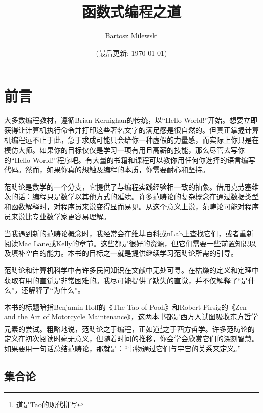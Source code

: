 \documentclass[11pt, book]{memoir}
\begin{document}
\setcounter{tocdepth}{4}
\setcounter{secnumdepth}{4}
\frontmatter

\title{\huge 函数式编程之道}
\author{\Large Bartosz Milewski }

\date{\vfill (最后更新: \today)}

\maketitle

\tableofcontents

\clearpage

\section{前言}

大多数编程教材，遵循Brian Kernighan的传统，以“Hello World!”开始。想要立即获得让计算机执行命令并打印这些著名文字的满足感是很自然的。但真正掌握计算机编程远不止于此，急于求成可能只会给你一种虚假的力量感，而实际上你只是在模仿大师。如果你的目标仅仅是学习一项有用且高薪的技能，那么尽管去写你的“Hello World!”程序吧。有大量的书籍和课程可以教你用任何你选择的语言编写代码。然而，如果你真的想触及编程的本质，你需要耐心和坚持。

范畴论是数学的一个分支，它提供了与编程实践经验相一致的抽象。借用克劳塞维茨的话：编程只是数学以其他方式的延续。许多范畴论的复杂概念在通过数据类型和函数解释时，对程序员来说变得显而易见。从这个意义上说，范畴论可能对程序员来说比专业数学家更容易理解。

当我遇到新的范畴论概念时，我经常会在维基百科或nLab上查找它们，或者重新阅读Mac Lane或Kelly的章节。这些都是很好的资源，但它们需要一些前置知识以及填补空白的能力。本书的目标之一就是提供继续学习范畴论所需的引导。

范畴论和计算机科学中有许多民间知识在文献中无处可寻。在枯燥的定义和定理中获取有用的直觉是非常困难的。我尽可能提供了缺失的直觉，并不仅解释了“是什么”，还解释了“为什么”。

本书的标题暗指Benjamin Hoff的《The Tao of Pooh》和Robert Pirsig的《Zen and the Art of Motorcycle Maintenance》，这两本书都是西方人试图吸收东方哲学元素的尝试。粗略地说，范畴论之于编程，正如道\footnote{道是Tao的现代拼写}之于西方哲学。许多范畴论的定义在初次阅读时毫无意义，但随着时间的推移，你会学会欣赏它们的深刻智慧。如果要用一句话总结范畴论，那就是：“事物通过它们与宇宙的关系来定义。”

\subsection{集合论}
\end{document}
